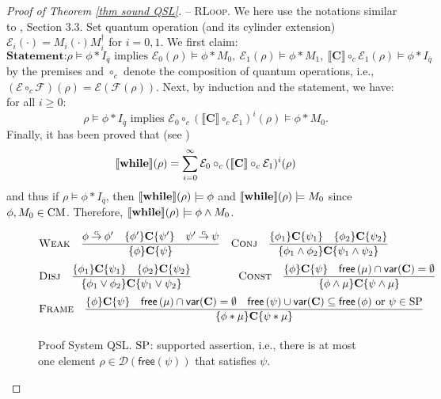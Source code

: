 \documentclass[conference,compsoc, 10pt]{IEEEtran}
\newcommand {\qbar} {{\overline{q}}}
\newcommand {\cD } {{\mathcal{D}}}
\newcommand {\cE } {{\mathcal{E}}}
\newcommand {\cF } {{\mathcal{F}}}
\newcommand {\id } {{I}}
\newcommand {\free }[1] {{\mathsf{free}\left(#1\right)}}
\newcommand {\var } {\mathsf{var}}
\newcommand {\prog } {{\mathbf{C}}}
\newcommand {\sem}[1] {\llbracket#1\rrbracket}
\newcommand{\sd}{\diamond}%
\DeclareRobustCommand{\gimp}{%
	\mathbin{\ooalign{$\rightarrow$\cr\hss\raisebox{1ex}{\scalebox{.5}{G}}\hss}}}
\begin{document}
\begin{appendices}
\begin{proof}[Proof of Theorem \ref{thm sound QSL}]
			\noindent -- \textsc{RLoop}. We here use the notations similar to \cite{Ying16}, Section 3.3. Set quantum operation (and its cylinder extension) $\cE_i(\cdot) = M_i(\cdot) M_i^\dag$ for $i = 0,1$. We first claim:
			$$\textbf{Statement:} \rho\models\phi\ast\id_{\qbar} \text{\ implies\ } \cE_0(\rho)\models\phi\ast M_0,\ \cE_1(\rho)\models\phi\ast M_1, \ \sem{\prog}\circ_{c}\cE_1(\rho)\models\phi\ast I_{\qbar}$$
			by the premises and $\circ_{c}$ denote the composition of quantum operations, i.e., $(\cE\circ_{c}\cF)(\rho) = \cE(\cF(\rho))$.
			Next, by induction and the statement, we have: for all $i\ge 0$:
			$$ \rho\models\phi\ast\id_{\qbar} \text{\ implies\ } \cE_0\circ_{c}(\sem{\prog}\circ_{c}\cE_1)^i(\rho)\models\phi\ast M_0.$$
			Finally, it has been proved that (see \cite{Ying11})
			$$\sem{{\bf while}}(\rho) = \sum_{i=0}^\infty \cE_0\circ_{c}(\sem{\prog}\circ_{c}\cE_1)^i(\rho) $$
			and thus if $\rho\models\phi\ast\id_{\qbar}$, then $\sem{{\bf while}}(\rho)\models\phi$ and $\sem{{\bf while}}(\rho)\models M_0$ since $\phi,M_0\in{\rm CM}$. Therefore, $\sem{{\bf while}}(\rho)\models \phi\wedge M_0$.	
			
			\begin{figure}[h]\centering
				\begin{equation*}\begin{split}
				&\textsc{Weak}\quad  \frac{\phi\gimp\phi^\prime\quad \{\phi^{\prime}\}\prog\{\psi^{\prime}\}\quad 
					\psi^{\prime}\gimp\psi  }{\{\phi\}\prog\{\psi\}} \quad
				\textsc{Conj}\quad \frac{\{\phi_1\}\prog\{\psi_1\}\quad\{\phi_2\}\prog\{\psi_2\}}{\{\phi_1\wedge\phi_2\}\prog\{\psi_1\wedge\psi_2\}} \\[0.1cm]
				&\textsc{Disj}\quad \frac{\{\phi_1\}\prog\{\psi_1\}\quad\{\phi_2\}\prog\{\psi_2\}}{\{\phi_1\vee\phi_2\}\prog\{\psi_1\vee\psi_2\}} \qquad\qquad\
				\textsc{Const}\quad \frac{\{\phi\}\prog\{\psi\}\quad\free{\mu}\cap\var(\prog)=\emptyset}{\{\phi\wedge\mu\}\prog\{\psi\wedge\mu\}} \\[0.1cm]
				&\textsc{Frame}\quad \frac{\{\phi\}\prog\{\psi\}\quad\free{\mu}\cap\var(\prog)=\emptyset\quad\free{\psi}\cup\var(\prog)\subseteq\free{\phi}\text{\ or\ }\psi\in{\rm SP}}{\{\phi\ast\mu\}\prog\{\psi\ast\mu\}} \\[0.1cm]
				\end{split}\end{equation*}
				\caption{Proof System QSL. ${\rm SP}$: supported assertion, i.e., there is at most one element $\rho\in\cD(\free{\psi})$ that satisfies $\psi$.}
			\end{figure}
			

\end{proof}
\end{appendices}
\end{document}

